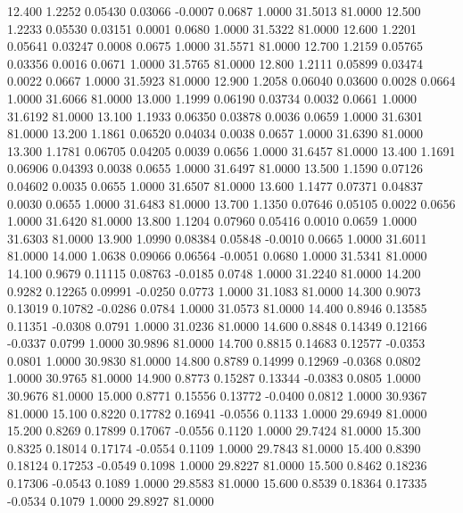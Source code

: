   12.400   1.2252   0.05430   0.03066  -0.0007   0.0687   1.0000  31.5013  81.0000
  12.500   1.2233   0.05530   0.03151   0.0001   0.0680   1.0000  31.5322  81.0000
  12.600   1.2201   0.05641   0.03247   0.0008   0.0675   1.0000  31.5571  81.0000
  12.700   1.2159   0.05765   0.03356   0.0016   0.0671   1.0000  31.5765  81.0000
  12.800   1.2111   0.05899   0.03474   0.0022   0.0667   1.0000  31.5923  81.0000
  12.900   1.2058   0.06040   0.03600   0.0028   0.0664   1.0000  31.6066  81.0000
  13.000   1.1999   0.06190   0.03734   0.0032   0.0661   1.0000  31.6192  81.0000
  13.100   1.1933   0.06350   0.03878   0.0036   0.0659   1.0000  31.6301  81.0000
  13.200   1.1861   0.06520   0.04034   0.0038   0.0657   1.0000  31.6390  81.0000
  13.300   1.1781   0.06705   0.04205   0.0039   0.0656   1.0000  31.6457  81.0000
  13.400   1.1691   0.06906   0.04393   0.0038   0.0655   1.0000  31.6497  81.0000
  13.500   1.1590   0.07126   0.04602   0.0035   0.0655   1.0000  31.6507  81.0000
  13.600   1.1477   0.07371   0.04837   0.0030   0.0655   1.0000  31.6483  81.0000
  13.700   1.1350   0.07646   0.05105   0.0022   0.0656   1.0000  31.6420  81.0000
  13.800   1.1204   0.07960   0.05416   0.0010   0.0659   1.0000  31.6303  81.0000
  13.900   1.0990   0.08384   0.05848  -0.0010   0.0665   1.0000  31.6011  81.0000
  14.000   1.0638   0.09066   0.06564  -0.0051   0.0680   1.0000  31.5341  81.0000
  14.100   0.9679   0.11115   0.08763  -0.0185   0.0748   1.0000  31.2240  81.0000
  14.200   0.9282   0.12265   0.09991  -0.0250   0.0773   1.0000  31.1083  81.0000
  14.300   0.9073   0.13019   0.10782  -0.0286   0.0784   1.0000  31.0573  81.0000
  14.400   0.8946   0.13585   0.11351  -0.0308   0.0791   1.0000  31.0236  81.0000
  14.600   0.8848   0.14349   0.12166  -0.0337   0.0799   1.0000  30.9896  81.0000
  14.700   0.8815   0.14683   0.12577  -0.0353   0.0801   1.0000  30.9830  81.0000
  14.800   0.8789   0.14999   0.12969  -0.0368   0.0802   1.0000  30.9765  81.0000
  14.900   0.8773   0.15287   0.13344  -0.0383   0.0805   1.0000  30.9676  81.0000
  15.000   0.8771   0.15556   0.13772  -0.0400   0.0812   1.0000  30.9367  81.0000
  15.100   0.8220   0.17782   0.16941  -0.0556   0.1133   1.0000  29.6949  81.0000
  15.200   0.8269   0.17899   0.17067  -0.0556   0.1120   1.0000  29.7424  81.0000
  15.300   0.8325   0.18014   0.17174  -0.0554   0.1109   1.0000  29.7843  81.0000
  15.400   0.8390   0.18124   0.17253  -0.0549   0.1098   1.0000  29.8227  81.0000
  15.500   0.8462   0.18236   0.17306  -0.0543   0.1089   1.0000  29.8583  81.0000
  15.600   0.8539   0.18364   0.17335  -0.0534   0.1079   1.0000  29.8927  81.0000
